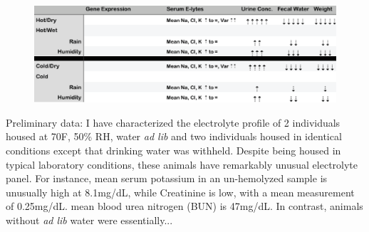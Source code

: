 \documentclass[11pt]{article}
\begin{document}
\begin{figure}
\hypertarget{Table 1}{}
\vspace{-5mm}
\begin{mdframed}
  \begin{center}
    \includegraphics[width=1\textwidth]{Aim1-table.eps}
  \end{center}
\end{mdframed}
\end{figure}


%
%


Preliminary data: I have characterized the electrolyte profile of 2 individuals housed at 70F, 50\% RH, water \textit{ad lib} and two individuals housed in identical conditions except that drinking water was withheld. Despite being housed in typical laboratory conditions, these animals have remarkably unusual electrolyte panel. For instance, mean serum potassium in an un-hemolyzed sample is unusually high at 8.1mg/dL, while Creatinine is low, with a mean measurement of 0.25mg/dL. mean blood urea nitrogen (BUN) is 47mg/dL. In contrast, animals without \textit{ad lib} water were essentially... \\  


\end{document}
